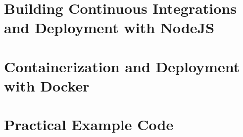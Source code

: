 \section{Building Continuous Integrations and Deployment with NodeJS}
\label{section:Building Continuous Integrations and Deployment with NodeJS}


\newpage

\section{Containerization and Deployment with Docker}
\label{section:Containerization and Deployment with Docker}


\newpage

\section{Practical Example Code}
\label{section:Practical Example Code}


\newpage








%
%
%
%
%
%
